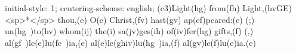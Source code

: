 initial-style: 1;
centering-scheme: english;
(c3)Light(hg) from(fh) Light,(hvGE) <sp>*</sp> thou,(e) O(e) Christ,(fv) hast(gv) ap(ef)peared:(e) (;) un(hg~)to(hv) whom(ij) the(i) sa(jv)ges(ih) of(iv)fer(hg) gifts,(f) (,) al(gf~)le(e)lu(fe~)ia,(e) al(e)le(ghiv)lu(hg~)ia,(f) al(gv)le(f)lu(e)ia.(e)
